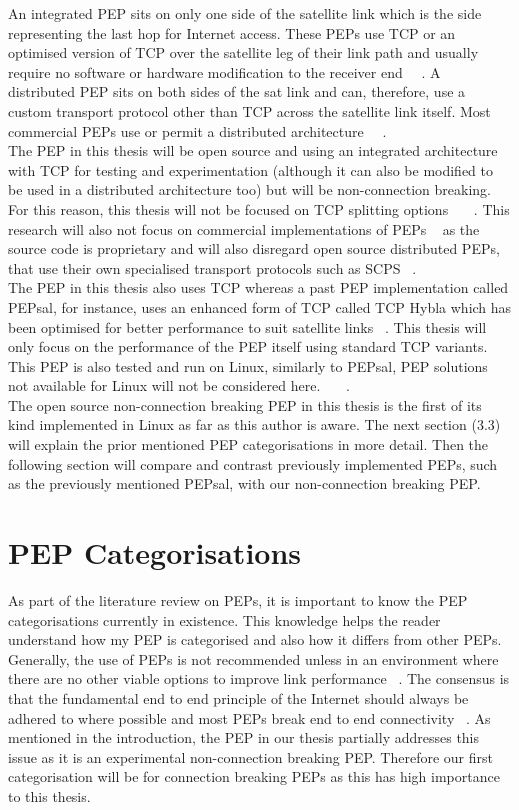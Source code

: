 An integrated PEP sits on only one side of the satellite link which is the side representing the last hop for Internet access. These PEPs use TCP or an optimised version of TCP over the satellite leg of their link path and usually require no software or hardware modification to the receiver end ~\cite{6}~\cite{14}. A distributed PEP sits on both sides of the sat link and can, therefore, use a custom transport protocol other than TCP across the satellite link itself. Most commercial PEPs use or permit a distributed architecture ~\cite{6}~\cite{14}. \\

The PEP in this thesis will be open source and using an integrated architecture with TCP for testing and experimentation (although it can also be modified to be used in a distributed architecture too) but will be non-connection breaking. For this reason, this thesis will not be focused on TCP splitting options ~\cite{14}~\cite{27}~\cite{28}. This research will also not focus on commercial implementations of PEPs ~\cite{29} as the source code is proprietary and will also disregard open source distributed PEPs, that use their own specialised transport protocols such as SCPS ~\cite{11}. \\

The PEP in this thesis also uses TCP whereas a past PEP implementation called PEPsal, for instance, uses an enhanced form of TCP called TCP Hybla which has been optimised for better performance to suit satellite links ~\cite{14}. This thesis will only focus on the performance of the PEP itself using standard TCP variants. This PEP is also tested and run on Linux, similarly to PEPsal, PEP solutions not available for Linux will not be considered here. ~\cite{30}~\cite{31}~\cite{32}. \\

The open source non-connection breaking PEP in this thesis is the first of its kind implemented in Linux as far as this author is aware. The next section (3.3) will explain the prior mentioned PEP categorisations in more detail. Then the following section will compare and contrast previously implemented PEPs, such as the previously mentioned PEPsal, with our non-connection breaking PEP. \\

\section{PEP Categorisations}
As part of the literature review on PEPs, it is important to know the PEP categorisations currently in existence. This knowledge helps the reader understand how my PEP is categorised and also how it differs from other PEPs. Generally, the use of PEPs is not recommended unless in an environment where there are no other viable options to improve link performance ~\cite{6}. The consensus is that the fundamental end to end principle of the Internet should always be adhered to where possible and most PEPs break end to end connectivity ~\cite{6}. As mentioned in the introduction, the PEP in our thesis partially addresses this issue as it is an experimental non-connection breaking PEP. Therefore our first categorisation will be for connection breaking PEPs as this has high importance to this thesis. 

